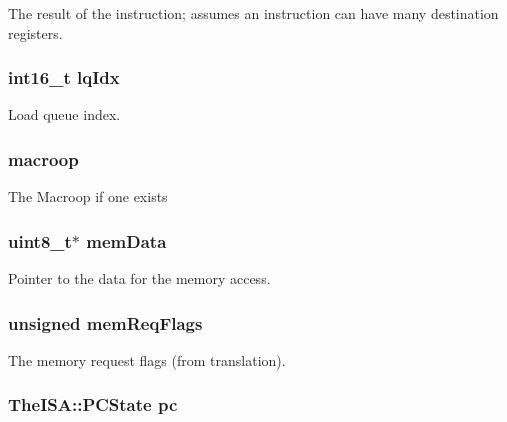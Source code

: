 \label{classBaseDynInst_a4ed9dfc2276eac05ce2f8a65849c2bf8}
The result of the instruction; assumes an instruction can have many destination registers. \hypertarget{classBaseDynInst_a543896e8c656ce7cce978a1ec4d29afe}{
\subsubsection[{lqIdx}]{\setlength{\rightskip}{0pt plus 5cm}int16\_\-t {\bf lqIdx}}}
\label{classBaseDynInst_a543896e8c656ce7cce978a1ec4d29afe}
Load queue index. \hypertarget{classBaseDynInst_a239d33ed2aa6ba1b897533642aa107a2}{
\subsubsection[{macroop}]{ {\bf macroop}}}
\label{classBaseDynInst_a239d33ed2aa6ba1b897533642aa107a2}
The Macroop if one exists \hypertarget{classBaseDynInst_a9c9a186aff5eddf449916952b8398116}{
\subsubsection[{memData}]{\setlength{\rightskip}{0pt plus 5cm}uint8\_\-t$\ast$ {\bf memData}}}
\label{classBaseDynInst_a9c9a186aff5eddf449916952b8398116}
Pointer to the data for the memory access. \hypertarget{classBaseDynInst_aba29e5174ccb47ac17cc2ff228a8e2af}{
\subsubsection[{memReqFlags}]{\setlength{\rightskip}{0pt plus 5cm}unsigned {\bf memReqFlags}}}
\label{classBaseDynInst_aba29e5174ccb47ac17cc2ff228a8e2af}
The memory request flags (from translation). \hypertarget{classBaseDynInst_ad3585c83b0eac985107aa5a86e43e1b4}{
\subsubsection[{pc}]{\setlength{\rightskip}{0pt plus 5cm}TheISA::PCState {\bf pc}}}
